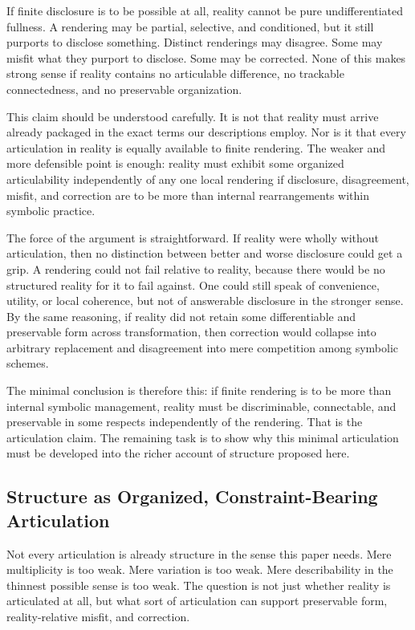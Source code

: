 \documentclass[11pt]{article}
\begin{document}
If finite disclosure is to be possible at all, reality cannot be pure undifferentiated fullness. A rendering may be partial, selective, and conditioned, but it still purports to disclose something. Distinct renderings may disagree. Some may misfit what they purport to disclose. Some may be corrected. None of this makes strong sense if reality contains no articulable difference, no trackable connectedness, and no preservable organization.

This claim should be understood carefully. It is not that reality must arrive already packaged in the exact terms our descriptions employ. Nor is it that every articulation in reality is equally available to finite rendering. The weaker and more defensible point is enough: reality must exhibit some organized articulability independently of any one local rendering if disclosure, disagreement, misfit, and correction are to be more than internal rearrangements within symbolic practice. \cite{Putnam1983RealismReason,Chakravartty2011ScientificRealismSEP}

The force of the argument is straightforward. If reality were wholly without articulation, then no distinction between better and worse disclosure could get a grip. A rendering could not fail relative to reality, because there would be no structured reality for it to fail against. One could still speak of convenience, utility, or local coherence, but not of answerable disclosure in the stronger sense. By the same reasoning, if reality did not retain some differentiable and preservable form across transformation, then correction would collapse into arbitrary replacement and disagreement into mere competition among symbolic schemes.

The minimal conclusion is therefore this: if finite rendering is to be more than internal symbolic management, reality must be discriminable, connectable, and preservable in some respects independently of the rendering. That is the articulation claim. The remaining task is to show why this minimal articulation must be developed into the richer account of structure proposed here.

\subsection{Structure as Organized, Constraint-Bearing Articulation}

Not every articulation is already structure in the sense this paper needs. Mere multiplicity is too weak. Mere variation is too weak. Mere describability in the thinnest possible sense is too weak. The question is not just whether reality is articulated at all, but what sort of articulation can support preservable form, reality-relative misfit, and correction.
\end{document}
